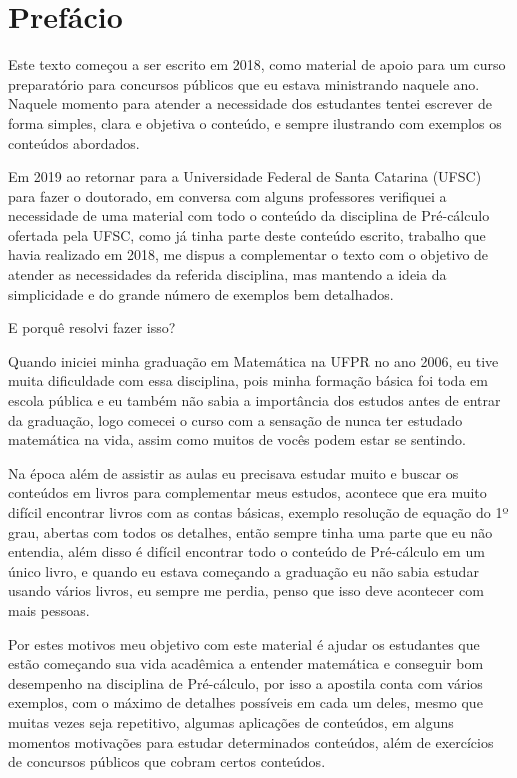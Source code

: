 
\chapter*{Prefácio}

Este texto começou a ser escrito em 2018, como material de apoio para um curso preparatório para concursos públicos que eu estava ministrando naquele ano. Naquele momento para atender a necessidade dos estudantes tentei escrever de forma simples, clara e objetiva o conteúdo, e sempre ilustrando com exemplos os conteúdos abordados.

Em 2019 ao retornar para a Universidade Federal de Santa Catarina (UFSC) para fazer o doutorado, em conversa com alguns professores verifiquei a necessidade de uma material com todo o conteúdo da disciplina de Pré-cálculo ofertada pela UFSC, como já tinha parte deste conteúdo escrito, trabalho que havia realizado em 2018, me dispus a complementar o texto com o objetivo de atender as necessidades da referida disciplina, mas mantendo a ideia da simplicidade e do grande número de exemplos bem detalhados. 

E porquê resolvi fazer isso?

Quando iniciei minha graduação em Matemática na UFPR no ano 2006, eu tive muita dificuldade com essa disciplina, pois minha formação básica foi toda em escola pública e eu também não sabia a importância dos estudos antes de entrar da graduação, logo comecei o curso com a sensação de nunca ter estudado matemática na vida, assim como muitos de vocês podem estar se sentindo. 

Na época além de assistir as aulas eu precisava estudar muito e buscar os conteúdos em livros para complementar meus estudos, acontece que era muito difícil encontrar livros com as contas básicas, exemplo resolução de equação do 1º grau, abertas com todos os detalhes, então sempre tinha uma parte que eu não entendia, além disso é difícil encontrar todo o conteúdo de Pré-cálculo em um único livro, e quando eu estava começando a graduação eu não sabia estudar usando vários livros, eu sempre me perdia, penso que isso deve acontecer com mais pessoas.

Por estes motivos meu objetivo com este material é ajudar os estudantes que estão começando sua vida acadêmica a entender matemática e conseguir bom desempenho na disciplina de Pré-cálculo, por isso a apostila conta com vários exemplos, com o máximo de detalhes possíveis em cada um deles, mesmo que muitas vezes seja repetitivo, algumas aplicações de conteúdos, em alguns momentos motivações para estudar determinados conteúdos, além de exercícios de concursos públicos que cobram certos conteúdos. 

